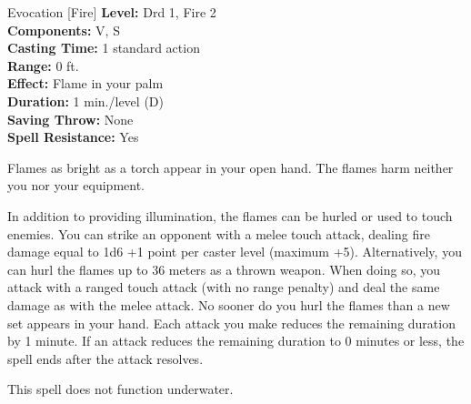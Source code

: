 {Evocation [Fire]}
{
	\textbf{Level:}
	Drd 1, Fire 2\\
	\textbf{Components:}
	V, S\\
	\textbf{Casting Time:}
	1 standard action\\
	\textbf{Range:}
	0 ft.\\
	\textbf{Effect:}
	Flame in your palm\\
	\textbf{Duration:}
	1 min./level (D)\\
	\textbf{Saving Throw:}
	None\\
	\textbf{Spell Resistance:}
	Yes\\
}
{
	Flames as bright as a torch appear in your open hand. The flames harm neither you nor your equipment.

	In addition to providing illumination, the flames can be hurled or used to touch enemies. You can strike an opponent with a melee touch attack, dealing fire damage equal to 1d6 +1 point per caster level (maximum +5). Alternatively, you can hurl the flames up to 36 meters as a thrown weapon. When doing so, you attack with a ranged touch attack (with no range penalty) and deal the same damage as with the melee attack. No sooner do you hurl the flames than a new set appears in your hand. Each attack you make reduces the remaining duration by 1 minute. If an attack reduces the remaining duration to 0 minutes or less, the spell ends after the attack resolves.

	This spell does not function underwater.

}
